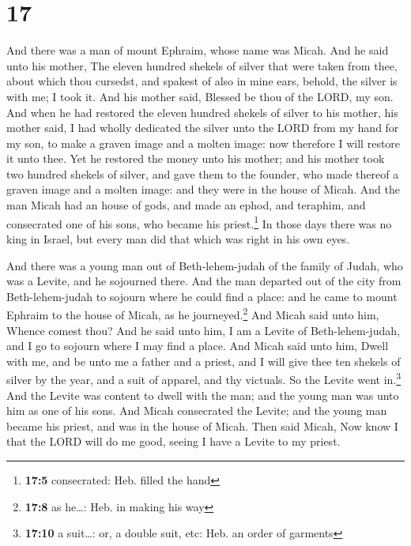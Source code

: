 \hypertarget{section-16}{%
\section{17}\label{section-16}}

 And there was a man of mount Ephraim, whose name was
Micah.  And he said unto his mother, The eleven hundred
shekels of silver that were taken from thee, about which thou cursedst,
and spakest of also in mine ears, behold, the silver is with me; I took
it. And his mother said, Blessed be thou of the LORD, my son.
 And when he had restored the eleven hundred shekels of
silver to his mother, his mother said, I had wholly dedicated the silver
unto the LORD from my hand for my son, to make a graven image and a
molten image: now therefore I will restore it unto thee. 
Yet he restored the money unto his mother; and his mother took two
hundred shekels of silver, and gave them to the founder, who made
thereof a graven image and a molten image: and they were in the house of
Micah.  And the man Micah had an house of gods, and made
an ephod, and teraphim, and consecrated one of his sons, who became his
priest.\footnote{\textbf{17:5} consecrated: Heb. filled the hand}
 In those days there was no king in Israel, but every man
did that which was right in his own eyes.

 And there was a young man out of Beth-lehem-judah of the
family of Judah, who was a Levite, and he sojourned there.
 And the man departed out of the city from
Beth-lehem-judah to sojourn where he could find a place: and he came to
mount Ephraim to the house of Micah, as he journeyed.\footnote{\textbf{17:8}
  as he\ldots: Heb. in making his way}  And Micah said
unto him, Whence comest thou? And he said unto him, I am a Levite of
Beth-lehem-judah, and I go to sojourn where I may find a place.
 And Micah said unto him, Dwell with me, and be unto me a
father and a priest, and I will give thee ten shekels of silver by the
year, and a suit of apparel, and thy victuals. So the Levite went
in.\footnote{\textbf{17:10} a suit\ldots: or, a double suit, etc: Heb.
  an order of garments}  And the Levite was content to
dwell with the man; and the young man was unto him as one of his sons.
 And Micah consecrated the Levite; and the young man
became his priest, and was in the house of Micah.  Then
said Micah, Now know I that the LORD will do me good, seeing I have a
Levite to my priest.


